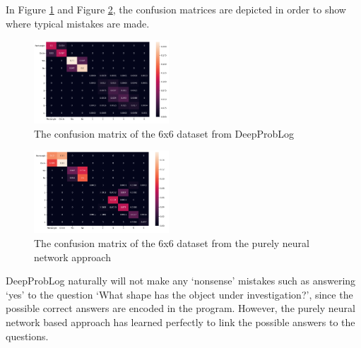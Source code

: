 \documentclass[english]{sobraep}
\begin{document}
In Figure \ref{fig:confusion_matrix_6x6_deepproblog} and Figure \ref{fig:confusion_matrix_6x6_pure_nn}, the confusion matrices are depicted in order to show where typical mistakes are made.

\begin{figure}[htp]
    \begin{center}
    \includegraphics[width=0.45\textwidth]{confusion_matrix_6x6_deepproblog.png} 
    \captionsetup{justification=centering}
    \caption{The confusion matrix of the 6x6 dataset from DeepProbLog}
    \label{fig:confusion_matrix_6x6_deepproblog}
    \end{center}
\end{figure}

\begin{figure}[htp]
    \begin{center}
    \includegraphics[width=0.45\textwidth]{confusion_matrix_6x6_pure_NN.png} 
    \captionsetup{justification=centering}
    \caption{The confusion matrix of the 6x6 dataset from the purely neural network approach}
    \label{fig:confusion_matrix_6x6_pure_nn}
    \end{center}
\end{figure}

DeepProbLog naturally will not make any `nonsense' mistakes such as answering `yes' to the question `What shape has the object under investigation?', since the possible correct answers are encoded in the program. However, the purely neural network based approach has learned perfectly to link the possible answers to the questions.
\end{document}
